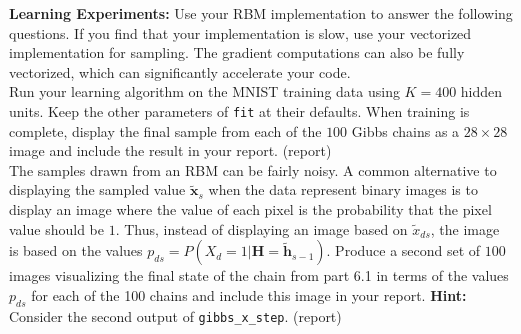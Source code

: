 \documentclass[11pt]{article}
\newcommand{\mbf}[1]{{\mathbf{#1}}}
\begin{document}
\begin{problem}{10} \textbf{Learning Experiments:} Use your RBM implementation to answer the following questions. If you find that your implementation is slow, use your vectorized implementation for sampling. The gradient computations can also be fully vectorized, which can significantly accelerate your code. \\

  Run your learning algorithm on the MNIST training data using $K=400$ hidden units. Keep the other
parameters of \verb|fit| at their defaults. When training is complete, display the final sample from each of the $100$ Gibbs chains as a $28\times 28$ image and include the result in your report. (report)\\

 The samples drawn from an RBM can be fairly noisy. A common alternative to displaying the sampled value $\tilde{\mbf{x}}_s$
when the data represent binary images is to display an image where the value of each pixel is the probability that the pixel value should be $1$. Thus, instead of displaying an image based on $\tilde{x}_{ds}$, the image is based on the values $p_{ds} = P(X_d=1|\mbf{H}=\tilde{\mbf{h}}_{s-1})$. Produce a second set of $100$ images visualizing the final state of the chain from part 6.1 
in terms of the values $p_{ds}$ for each of the 100 chains and include this image in your report. \textbf{Hint:} Consider the second output of \verb|gibbs_x_step|. (report) 

\end{problem}

\showpoints
\end{document}
